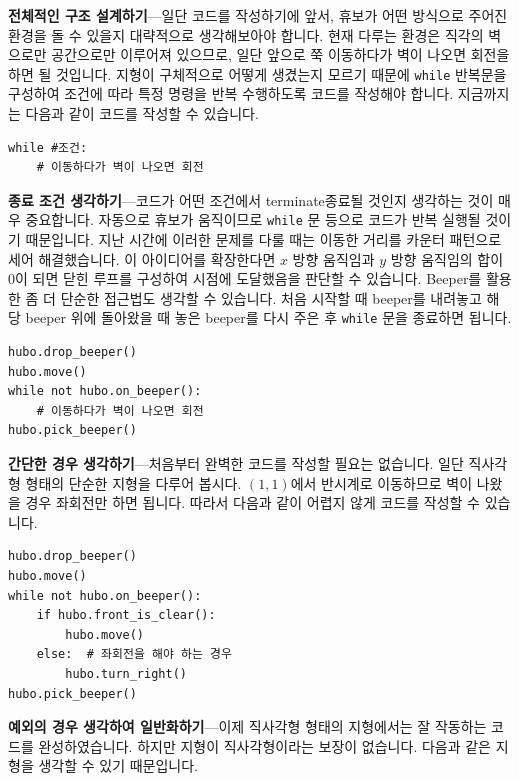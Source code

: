 \documentclass[../main.tex]{subfiles}
\begin{document}
\textbf{전체적인 구조 설계하기}---일단 코드를 작성하기에 앞서, 휴보가 어떤 방식으로 주어진 환경을 돌 수 있을지 대략적으로 생각해보아야 합니다.
현재 다루는 환경은 직각의 벽으로만 공간으로만 이루어져 있으므로, 일단 앞으로 쭉 이동하다가 벽이 나오면 회전을 하면 될 것입니다.
지형이 구체적으로 어떻게 생겼는지 모르기 때문에 \texttt{while} 반복문을 구성하여 조건에 따라 특정 명령을 반복 수행하도록 코드를 작성해야 합니다.
지금까지는 다음과 같이 코드를 작성할 수 있습니다.
\begin{verbatim}
while #조건:
	# 이동하다가 벽이 나오면 회전
\end{verbatim}

\textbf{종료 조건 생각하기}---코드가 어떤 조건에서 terminate종료될 것인지 생각하는 것이 매우 중요합니다.
자동으로 휴보가 움직이므로 \texttt{while} 문 등으로 코드가 반복 실행될 것이기 때문입니다.
지난 시간에 이러한 문제를 다룰 때는 이동한 거리를 카운터 패턴으로 세어 해결했습니다.
이 아이디어를 확장한다면 $x$ 방향 움직임과 $y$ 방향 움직임의 합이 0이 되면 닫힌 루프를 구성하여 시점에 도달했음을 판단할 수 있습니다.
Beeper를 활용한 좀 더 단순한 접근법도 생각할 수 있습니다.
처음 시작할 때 beeper를 내려놓고 해당 beeper 위에 돌아왔을 때 놓은 beeper를 다시 주은 후 \texttt{while} 문을 종료하면 됩니다.
\begin{verbatim}
hubo.drop_beeper()
hubo.move()
while not hubo.on_beeper():
	# 이동하다가 벽이 나오면 회전
hubo.pick_beeper()
\end{verbatim}

\textbf{간단한 경우 생각하기}---처음부터 완벽한 코드를 작성할 필요는 없습니다.
일단 직사각형 형태의 단순한 지형을 다루어 봅시다.
$(1, 1)$에서 반시계로 이동하므로 벽이 나왔을 경우 좌회전만 하면 됩니다.
따라서 다음과 같이 어렵지 않게 코드를 작성할 수 있습니다.
\begin{verbatim}
hubo.drop_beeper()
hubo.move()
while not hubo.on_beeper():
	if hubo.front_is_clear():
		hubo.move()
	else:  # 좌회전을 해야 하는 경우
		hubo.turn_right()
hubo.pick_beeper()
\end{verbatim}

\textbf{예외의 경우 생각하여 일반화하기}---이제 직사각형 형태의 지형에서는 잘 작동하는 코드를 완성하였습니다.
하지만 지형이 직사각형이라는 보장이 없습니다.
다음과 같은 지형을 생각할 수 있기 때문입니다.
\end{document}
